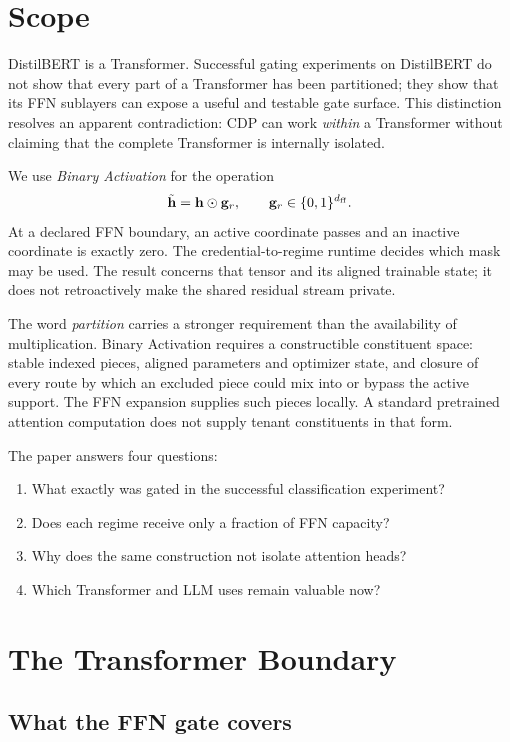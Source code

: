 \documentclass[11pt]{article}
\begin{document}
\section{Scope}

DistilBERT is a Transformer. Successful gating experiments on DistilBERT do not
show that every part of a Transformer has been partitioned; they show that its
FFN sublayers can expose a useful and testable gate surface. This distinction
resolves an apparent contradiction: CDP can work \emph{within} a Transformer
without claiming that the complete Transformer is internally isolated.

We use \emph{Binary Activation} for the operation
\begin{equation}
  \tilde{\mathbf{h}}=\mathbf{h}\odot\mathbf{g}_r,
  \qquad \mathbf{g}_r\in\{0,1\}^{d_{\mathrm{ff}}}.
  \label{eq:gate}
\end{equation}
At a declared FFN boundary, an active coordinate passes and an inactive
coordinate is exactly zero. The credential-to-regime runtime decides which
mask may be used. The result concerns that tensor and its aligned trainable
state; it does not retroactively make the shared residual stream private.

The word \emph{partition} carries a stronger requirement than the availability
of multiplication. Binary Activation requires a constructible constituent
space: stable indexed pieces, aligned parameters and optimizer state, and
closure of every route by which an excluded piece could mix into or bypass the
active support. The FFN expansion supplies such pieces locally. A standard
pretrained attention computation does not supply tenant constituents in that
form.

The paper answers four questions:
\begin{enumerate}
  \item What exactly was gated in the successful classification experiment?
  \item Does each regime receive only a fraction of FFN capacity?
  \item Why does the same construction not isolate attention heads?
  \item Which Transformer and LLM uses remain valuable now?
\end{enumerate}

\section{The Transformer Boundary}

\subsection{What the FFN gate covers}
\end{document}
